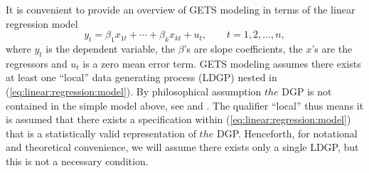 \documentclass[article,nojss]{jss}
\begin{document}
It is convenient to provide an overview of GETS modeling in terms of the linear regression model
%
\begin{equation}\label{eq:linear:regression:model}
y_t = \beta_1 x_{1t} + \cdots + \beta_k x_{kt} + u_t, \qquad t=1,2,\ldots, n,
\end{equation}
%
where $y_t$ is the dependent variable, the $\beta$'s are slope
coefficients, the $x$'s are the regressors and $u_t$ is a zero mean
error term. GETS modeling assumes there exists at least one ``local''
data generating process (LDGP) nested in
(\ref{eq:linear:regression:model}). By philosophical assumption $the$
DGP is not contained in the simple model above, see
\cite{Sucarrat2010} and \citet[][Sections
6.2--6.3]{HendryDoornik2014}. The qualifier ``local'' thus means it is
assumed that there exists a specification within
(\ref{eq:linear:regression:model}) that is a statistically valid
representation of $the$ DGP. Henceforth, for notational and
theoretical convenience, we will assume there exists only a single
LDGP, but this is not a necessary condition.
\end{document}
